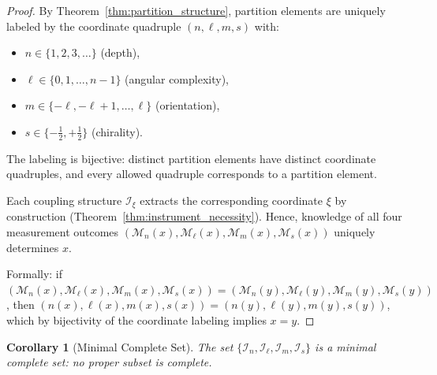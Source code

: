 \documentclass[twocolumn,10pt,a4paper]{article}
\newtheorem{corollary}[theorem]{Corollary}
\theoremstyle{remark}
\begin{document}
\begin{proof}
By Theorem~\ref{thm:partition_structure}, partition elements are uniquely labeled by the coordinate quadruple $(n, \ell, m, s)$ with:
\begin{itemize}[noitemsep]
    \item $n \in \{1, 2, 3, \ldots\}$ (depth),
    \item $\ell \in \{0, 1, \ldots, n-1\}$ (angular complexity),
    \item $m \in \{-\ell, -\ell+1, \ldots, \ell\}$ (orientation),
    \item $s \in \{-\tfrac{1}{2}, +\tfrac{1}{2}\}$ (chirality).
\end{itemize}

The labeling is bijective: distinct partition elements have distinct coordinate quadruples, and every allowed quadruple corresponds to a partition element.

Each coupling structure $\mathcal{I}_\xi$ extracts the corresponding coordinate $\xi$ by construction (Theorem~\ref{thm:instrument_necessity}). Hence, knowledge of all four measurement outcomes $(\mathcal{M}_n(x), \mathcal{M}_\ell(x), \mathcal{M}_m(x), \mathcal{M}_s(x))$ uniquely determines $x$.

Formally: if $(\mathcal{M}_n(x), \mathcal{M}_\ell(x), \mathcal{M}_m(x), \mathcal{M}_s(x)) = (\mathcal{M}_n(y), \mathcal{M}_\ell(y), \mathcal{M}_m(y), \mathcal{M}_s(y))$, then $(n(x), \ell(x), m(x), s(x)) = (n(y), \ell(y), m(y), s(y))$, which by bijectivity of the coordinate labeling implies $x = y$.
\end{proof}

\begin{corollary}[Minimal Complete Set]
\label{cor:minimal_complete}
The set $\{\mathcal{I}_n, \mathcal{I}_\ell, \mathcal{I}_m, \mathcal{I}_s\}$ is a \emph{minimal} complete set: no proper subset is complete.
\end{corollary}
\end{document}
